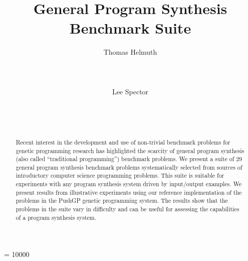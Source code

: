 \documentclass{sig-alternate}
\begin{document}
%


\widowpenalty = 10000

\title{General Program Synthesis Benchmark Suite}


\author{
\alignauthor
Thomas Helmuth\\
       \\
       \\
       \\
\alignauthor
Lee Spector\\
       \\
       \\
       \\
}

\maketitle

\begin{abstract}
Recent interest in the development and use of non-trivial benchmark problems for genetic programming research has highlighted the scarcity of general program synthesis (also called ``traditional programming'') benchmark problems. We present a suite of $29$ general program synthesis benchmark problems systematically selected from sources of introductory computer science programming problems. This suite is suitable for experiments with any program synthesis system driven by input/output examples. We present results from illustrative experiments using our reference implementation of the problems in the PushGP genetic programming system. The results show that the problems in the suite vary in difficulty and can be useful for assessing the capabilities of a program synthesis system.
\end{abstract}
\end{document}
